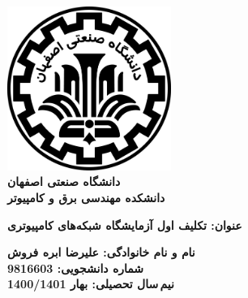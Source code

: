 \begin{titlepage}
\begin{center}
\includegraphics[width=0.4\textwidth]{figures/IUT Logo.png}\\
        
\LARGE
\textbf{دانشگاه صنعتی اصفهان}\\
\textbf{دانشکده مهندسی برق و کامپیوتر}\\
        
\vfill
        
\huge
\textbf{عنوان: تکلیف اول آزمایشگاه شبکه‌های کامپیوتری}\\
        
\vfill
        
\LARGE
\textbf{نام و نام خانوادگی: علیرضا ابره فروش}\\
\textbf{شماره دانشجویی: 9816603}\\
\textbf{نیم\,سال تحصیلی: بهار 1400/1401}\\
\end{center}
\end{titlepage}
